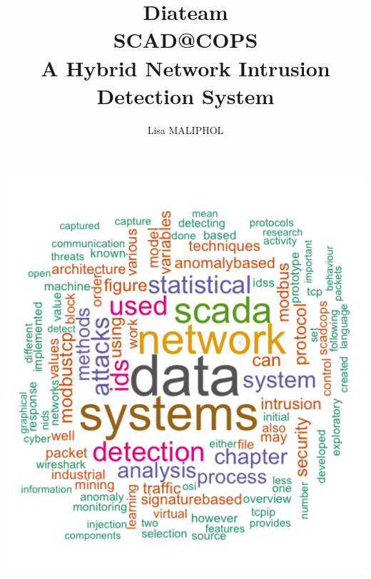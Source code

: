 \documentclass[11pt,]{article}
\title{Diateam\\SCAD@COPS\\A Hybrid Network Intrusion Detection System}
\author{Lisa MALIPHOL}
\date{}
\begin{document}
\maketitle


\includegraphics{thesis_files/figure-latex/unnamed-chunk-3-1.pdf}

\thispagestyle{empty}

\newpage
\thispagestyle{empty} \mbox{}

\clearpage
{}
\end{document}
